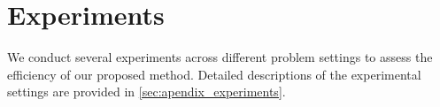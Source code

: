 \section{Experiments}
\label{sec:Experiments} 

We conduct several experiments across different problem settings to assess the efficiency of our proposed method. Detailed descriptions of the experimental settings are provided in \cref{sec:apendix_experiments}.





